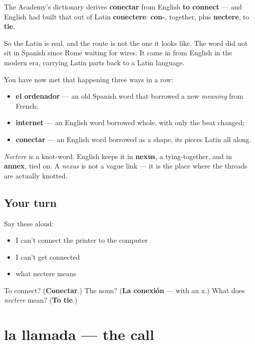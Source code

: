 \begin{cousinweb}
The Academy's dictionary derives \textbf{conectar} from English \textbf{to connect} — and English had built that out of Latin \textbf{conectere}: \textbf{con-}, together, plus \textbf{nectere}, to \textbf{tie}.

So the Latin is real, and the route is not the one it looks like. The word did not sit in Spanish since Rome waiting for wires. It came in from English in the modern era, carrying Latin parts back to a Latin language.

You have now met that happening three ways in a row:

\begin{itemize}
\raggedright
  \item \textbf{el ordenador} — an old Spanish word that borrowed a new \emph{meaning} from French;
  \item \textbf{internet} — an English word borrowed whole, with only the beat changed;
  \item \textbf{conectar} — an English word borrowed as a shape, its pieces Latin all along.
\end{itemize}

\emph{Nectere} is a knot-word. English keeps it in \textbf{nexus}, a tying-together, and in \textbf{annex}, tied on. A \emph{nexus} is not a vague link — it is the place where the threads are actually knotted.
\end{cousinweb}

\subsection*{Your turn}
Say these aloud:

\begin{itemize}
\raggedright
  \item I can't connect the printer to the computer
  \item I can't get connected
  \item what nectere means
\end{itemize}

\begin{tcolorbox}[breakable,colback=teal!4,colframe=teal!35!black,title={Before you move on}]
To connect? (\textbf{Conectar}.) The noun? (\textbf{La conexión} — with an x.) What does \emph{nectere} mean? (\textbf{To tie}.)
\end{tcolorbox}
\section[la llamada]{la llamada — the call}

